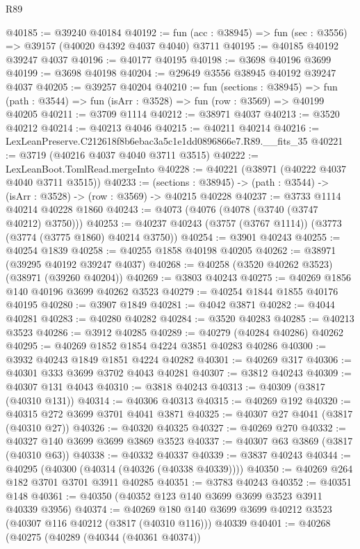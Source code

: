 \begin{lexlean}{R89}
\begin{coremodule}
@40185 := @39240 @40184
@40192 := fun (acc : @38945) => fun (sec : @3556) => @39157 (@40020 @4392 @4037 @4040) @3711
@40195 := @40185 @40192 @39247 @4037
@40196 := @40177 @40195
@40198 := @3698 @40196 @3699
@40199 := @3698 @40198
@40204 := @29649 @3556 @38945 @40192 @39247 @4037
@40205 := @39257 @40204
@40210 := fun (sections : @38945) =>
  fun (path : @3544) => fun (isArr : @3528) => fun (row : @3569) => @40199 @40205
@40211 := @3709 @1114
@40212 := @38971 @4037
@40213 := @3520 @40212
@40214 := @40213 @4046
@40215 := @40211 @40214
@40216 := LexLeanPreserve.C212618f8b6ebac3a5c1e1dd0896866e7.R89.__fits_35
@40221 := @3719 (@40216 @4037 @4040 @3711 @3515)
@40222 := LexLeanBoot.TomlRead.mergeInto
@40228 := @40221 (@38971 (@40222 @4037 @4040 @3711 @3515))
@40233 := (sections : @38945) -> (path : @3544) -> (isArr : @3528) -> (row : @3569) -> @40215 @40228
@40237 := @3733 @1114 @40214 @40228 @1860
@40243 := @4073 (@4076 (@4078 (@3740 (@3747 @40212) @3750)))
@40253 := @40237 @40243 (@3757 (@3767 @1114)) (@3773 (@3774 (@3775 @1860) @40214 @3750))
@40254 := @3901 @40243
@40255 := @40254 @1839
@40258 := @40255 @1858 @40198 @40205
@40262 := @38971 (@39295 @40192 @39247 @4037)
@40268 := @40258 (@3520 @40262 @3523) (@38971 (@39260 @40204))
@40269 := @3803 @40243
@40275 := @40269 @1856 @140 @40196 @3699 @40262 @3523
@40279 := @40254 @1844 @1855 @40176 @40195
@40280 := @3907 @1849
@40281 := @4042 @3871
@40282 := @4044 @40281
@40283 := @40280 @40282
@40284 := @3520 @40283
@40285 := @40213 @3523
@40286 := @3912 @40285
@40289 := @40279 (@40284 @40286) @40262
@40295 := @40269 @1852 @1854 @4224 @3851 @40283 @40286
@40300 := @3932 @40243 @1849 @1851 @4224 @40282
@40301 := @40269 @317
@40306 := @40301 @333 @3699 @3702 @4043 @40281
@40307 := @3812 @40243
@40309 := @40307 @131 @4043
@40310 := @3818 @40243
@40313 := @40309 (@3817 (@40310 @131))
@40314 := @40306 @40313
@40315 := @40269 @192
@40320 := @40315 @272 @3699 @3701 @4041 @3871
@40325 := @40307 @27 @4041 (@3817 (@40310 @27))
@40326 := @40320 @40325
@40327 := @40269 @270
@40332 := @40327 @140 @3699 @3699 @3869 @3523
@40337 := @40307 @63 @3869 (@3817 (@40310 @63))
@40338 := @40332 @40337
@40339 := @3837 @40243
@40344 := @40295 (@40300 (@40314 (@40326 (@40338 @40339))))
@40350 := @40269 @264 @182 @3701 @3701 @3911 @40285
@40351 := @3783 @40243
@40352 := @40351 @148
@40361 := @40350 (@40352 @123 @140 @3699 @3699 @3523 @3911 @40339 @3956)
@40374 := @40269
    @180
    @140
    @3699
    @3699
    @40212
    @3523
    (@40307 @116 @40212 (@3817 (@40310 @116)))
    @40339
@40401 := @40268
    (@40275
      (@40289
        (@40344 (@40361 @40374))

\end{coremodule}
\end{lexlean}
